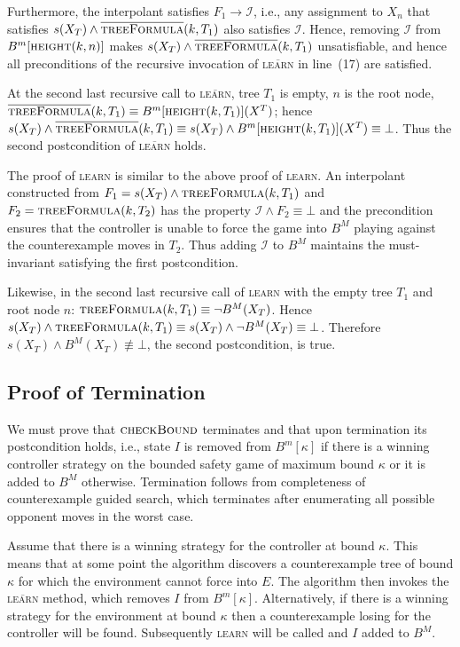 \documentclass{llncs}
\newcommand{\II}{\mathcal{I}}
\newcommand{\textoverline}[1]{$\overline{\mbox{#1}}$}
\begin{document}
Furthermore, the interpolant satisfies $F_1 \rightarrow \II$, i.e., any
assignment to $X_n$ that satisfies $s(X_T) \land
\textsc{\textoverline{treeFormula}}(k, T_1)$ also satisfies $\II$.  Hence,
removing $\II$ from $B^m[\textsc{height}(k, n)]$ makes $s(X_T) \land
\textsc{\textoverline{treeFormula}}(k, T_1)$ unsatisfiable, and hence all
preconditions of the recursive invocation of \textsc{\textoverline{learn}} in
line~(17) are satisfied.  

At the second last recursive call to \textsc{\textoverline{learn}}, tree $T_1$
is empty, $n$ is the root node, $\textsc{\textoverline{treeFormula}}(k, T_1)
\equiv B^m[\textsc{height}(k, T_1)](X^T)$; hence $s(X_T) \land
\textsc{\textoverline{treeFormula}}(k, T_1) \equiv s(X_T) \land
B^m[\textsc{height}(k, T_1)](X^T) \equiv \bot$.  Thus the second postcondition of
\textsc{\textoverline{learn}} holds.

The proof of \textsc{learn} is similar to the above proof of \textsc{learn}. An
interpolant constructed from $F_1=s(X_T) \land \textsc{treeFormula}(k, T_1)$
and $F_2 = \textsc{treeFormula}(k, T_2)$ has the property $\II \land F_2 \equiv
\bot$ and the precondition ensures that the controller is unable to force the
game into $B^M$ playing against the counterexample moves in $T_2$. Thus adding
$\II$ to $B^M$ maintains the must-invariant satisfying the first postcondition.

Likewise, in the second last recursive call of \textsc{learn} with the empty
tree $T_1$ and root node $n$: $\textsc{treeFormula}(k, T_1) \equiv \lnot
B^M(X_T)$.  Hence $s(X_T) \land \textsc{treeFormula}(k, T_1) \equiv
s(X_T) \land \lnot B^M(X_T) \equiv \bot$. Therefore $s(X_T) \land
B^M(X_T) \not\equiv \bot$, the second postcondition, is true.

\subsection{Proof of Termination}

We must prove that $\textsc{checkBound}$ terminates and that upon termination
its postcondition holds, i.e., state $I$ is removed from $B^m[\kappa]$ if there
is a winning controller strategy on the bounded safety game of maximum bound
$\kappa$ or it is added to $B^M$ otherwise. Termination follows from
completeness of counterexample guided search, which terminates after
enumerating all possible opponent moves in the worst case.

Assume that there is a winning strategy for the controller at bound $\kappa$.
This means that at some point the algorithm discovers a counterexample tree of
bound $\kappa$ for which the environment cannot force into $E$. The algorithm
then invokes the \textsc{\textoverline{learn}} method, which removes $I$ from
$B^m[\kappa]$.  Alternatively, if there is a winning strategy for the
environment at bound $\kappa$ then a counterexample losing for the controller
will be found.  Subsequently \textsc{learn} will be called and $I$ added to
$B^M$.
\end{document}
